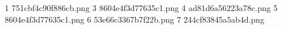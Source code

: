 1 751cbf4c90f886cb.png
3 8604e4f3d77635c1.png
4 ad81d6a56223a78c.png
5 8604e4f3d77635c1.png
6 53e66c3367b7f22b.png
7 244cf83845a5ab4d.png
